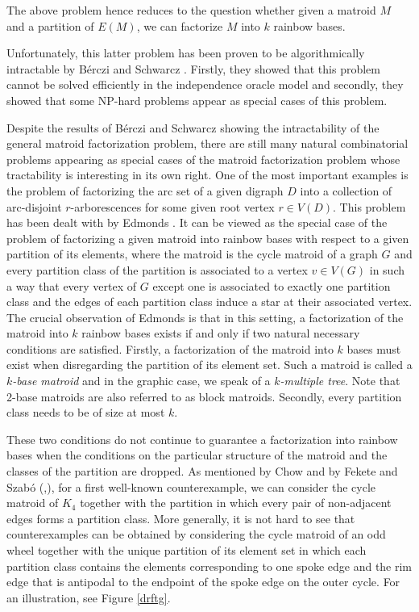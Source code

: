 \documentclass{article}
\begin{document}
 The above problem hence reduces to the question whether given a matroid $M$ and a partition of $E(M)$, we can factorize $M$ into $k$ rainbow bases.

Unfortunately, this latter problem has been proven to be algorithmically intractable by B\'erczi and Schwarcz \cite{bs}. Firstly, they showed that this problem cannot be solved efficiently in the independence oracle model and secondly, they showed that some NP-hard problems appear as special cases of this problem.

Despite the results of B\'erczi and Schwarcz showing the intractability of the general matroid factorization problem, there are still many natural combinatorial problems appearing as special cases of the matroid factorization problem whose tractability is interesting in its own right. One of the most important examples is the problem of factorizing the arc set of a given digraph $D$ into a collection of arc-disjoint $r$-arborescences for some given root vertex $r \in V(D)$. This problem has been dealt with by Edmonds \cite{e4}. It can be viewed as the special case of the problem of factorizing a given matroid into rainbow bases with respect to a given partition of its elements, where the  matroid is the cycle matroid of a graph $G$ and every partition class of the partition is associated to a vertex $v \in V(G)$ in such a way that every vertex of $G$ except one is associated to exactly one partition class and the edges of each partition class induce a star at their associated vertex. The crucial observation of Edmonds is that in this setting, a factorization of the matroid into $k$ rainbow bases exists if and only if two natural necessary conditions are satisfied. Firstly, a factorization of the matroid into $k$ bases must exist when disregarding the partition of its element set. Such a matroid is called a {\it $k$-base matroid} and in the graphic case, we speak of a {\it $k$-multiple tree}. Note that 2-base matroids are also referred to as block matroids. Secondly, every partition class needs to be of size at most $k$.

These two conditions do not continue to guarantee a factorization into rainbow bases when the conditions on the particular structure of the matroid and the classes of the partition are dropped. As mentioned by Chow \cite{chow} and by Fekete and Szab\'o (\cite{fs},\cite{fsj}), for a first well-known counterexample, we can consider the cycle matroid of $K_4$ together with the partition in which every pair of non-adjacent edges forms a partition class. More generally, it is not hard to see that  counterexamples can be obtained by considering the cycle matroid of an odd wheel together with the unique partition of its  element set in which each partition class contains the elements corresponding to one spoke edge and the rim edge that is antipodal to the endpoint of the spoke edge on the outer cycle. For an illustration, see Figure \ref{drftg}.
\end{document}
